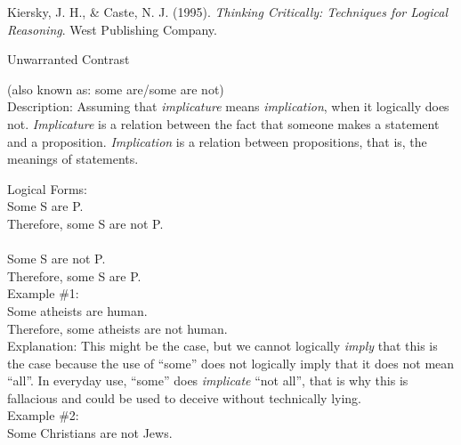\documentclass[a4paper,12pt,single,pdftex]{scrartcl}
\begin{document}
      
        
          Kiersky, J. H., \& Caste, N. J. (1995). {\it Thinking Critically: Techniques for Logical Reasoning}. West Publishing Company.
        
      
    
  

Unwarranted Contrast
    
      (also known as: some are/some are not)
    \\

  
    Description: Assuming that {\it implicature} means {\it implication}, when it logically does not.  {\it Implicature} is a relation between the fact that someone makes a statement and a proposition.  {\it Implication}  is a relation between propositions, that is, the meanings of statements.

    
      Logical Forms:
    \\

    
      Some S are P.
    \\

    
      Therefore, some S are not P.      
    \\

    
       
    \\

    
      Some S are not P.
    \\

    
      Therefore, some S are P.
    \\

    
      Example \#1:
    \\

    
      Some atheists are human.
    \\

    
      Therefore, some atheists are not human.
    \\

    
      Explanation: This might be the case, but we cannot logically {\it imply}  that this is the case because the use of “some” does not logically imply that it does not mean “all”.  In everyday use, “some” does {\it implicate}  “not all”, that is why this is fallacious and could be used to deceive without technically lying.
    \\

    
      Example \#2:
    \\

    
      Some Christians are not Jews.
    \\
\end{document}
